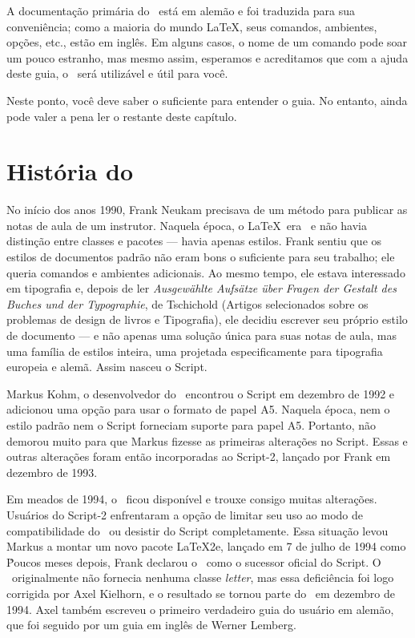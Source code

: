 A documentação primária do \KOMAScript\ está em alemão e foi traduzida para sua conveniência; como a maioria do mundo \LaTeX, seus comandos, ambientes, opções, etc., estão em inglês. Em alguns casos, o nome de um comando pode soar um pouco estranho, mas mesmo assim, esperamos e acreditamos que com a ajuda deste guia, o \KOMAScript\ será utilizável e útil para você.

Neste ponto, você deve saber o suficiente para entender o guia. No entanto, ainda pode valer a pena ler o restante deste capítulo.

\section{História do \KOMAScript}
No início dos anos 1990, Frank Neukam precisava de um método para publicar as notas de aula de um instrutor. Naquela época, o \LaTeX\ era \LaTeXe\ e não havia distinção entre classes e pacotes — havia apenas estilos. Frank sentiu que os estilos de documentos padrão não eram bons o suficiente para seu trabalho; ele queria comandos e ambientes adicionais. Ao mesmo tempo, ele estava interessado em tipografia e, depois de ler\textit{ Ausgewählte Aufsätze über Fragen der Gestalt des Buches und der Typographie}, de Tschichold (Artigos selecionados sobre os problemas de design de livros e Tipografia), ele decidiu escrever seu próprio estilo de documento — e não apenas uma solução única para suas notas de aula, mas uma família de estilos inteira, uma projetada especificamente para tipografia europeia e alemã. Assim nasceu o Script.

Markus Kohm, o desenvolvedor do \KOMAScript\, encontrou o Script em dezembro de 1992 e adicionou uma opção para usar o formato de papel A5. Naquela época, nem o estilo padrão nem o Script forneciam suporte para papel A5. Portanto, não demorou muito para que Markus fizesse as primeiras alterações no Script. Essas e outras alterações foram então incorporadas ao Script-2, lançado por Frank em dezembro de 1993.

Em meados de 1994, o \LaTeXe\ ficou disponível e trouxe consigo muitas alterações. Usuários do Script-2 enfrentaram a opção de limitar seu uso ao modo de compatibilidade do \LaTeXe\ ou desistir do Script completamente. Essa situação levou Markus a montar um novo pacote \LaTeX2e, lançado em 7 de julho de 1994 como \KOMAScript\. Poucos meses depois, Frank declarou o \KOMAScript\ como o sucessor oficial do Script. O \KOMAScript\ originalmente não fornecia nenhuma classe \textit{letter}, mas essa deficiência foi logo corrigida por Axel Kielhorn, e o resultado se tornou parte do \KOMAScript\ em dezembro de 1994. Axel também escreveu o primeiro verdadeiro guia do usuário em alemão, que foi seguido por um guia em inglês de Werner Lemberg.

